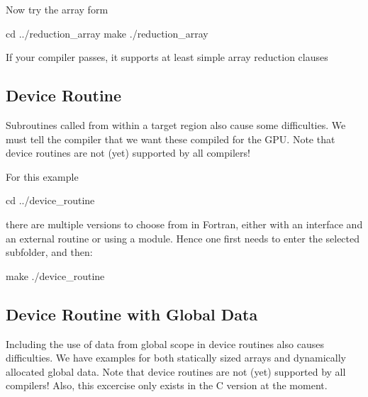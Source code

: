 \documentclass[
]{article}
\newenvironment{Shaded}{}{}
\newcommand{\BuiltInTok}[1]{#1}
\newcommand{\ExtensionTok}[1]{#1}
\newcommand{\FunctionTok}[1]{\textcolor[rgb]{0.02,0.16,0.49}{#1}}
\newcommand{\NormalTok}[1]{#1}
\begin{document}
Now try the array form

\begin{Shaded}
\begin{Highlighting}[]
\BuiltInTok{cd}\NormalTok{ ../reduction\_array}
\FunctionTok{make}
\ExtensionTok{./reduction\_array}
\end{Highlighting}
\end{Shaded}

If your compiler passes, it supports at least simple array reduction
clauses

\hypertarget{device-routine}{%
\subsection{Device Routine}\label{device-routine}}

Subroutines called from within a target region also cause some
difficulties. We must tell the compiler that we want these compiled for
the GPU. Note that device routines are not (yet) supported by all
compilers!

For this example

\begin{Shaded}
\begin{Highlighting}[]
\BuiltInTok{cd}\NormalTok{ ../device\_routine}
\end{Highlighting}
\end{Shaded}

there are multiple versions to choose from in Fortran, either with an
interface and an external routine or using a module. Hence one first
needs to enter the selected subfolder, and then:

\begin{Shaded}
\begin{Highlighting}[]
\FunctionTok{make}
\ExtensionTok{./device\_routine}
\end{Highlighting}
\end{Shaded}

\hypertarget{device-routine-with-global-data}{%
\subsection{Device Routine with Global
Data}\label{device-routine-with-global-data}}

Including the use of data from global scope in device routines also
causes difficulties. We have examples for both statically sized arrays
and dynamically allocated global data. Note that device routines are not
(yet) supported by all compilers! Also, this excercise only exists in
the C version at the moment.
\end{document}
